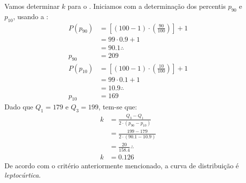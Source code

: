 Vamos determinar $k$ para o . Iniciamos com a
determinação dos percentis $p_{90}$ e $p_{10}$, usando a
:
\begin{align*}
    P(p_{90}) &= \left[(100-1) \cdot \left(\frac{90}{100}\right)\right] + 1 \\
              &= 99 \cdot 0.9 + 1 \\
              &= 90.1 \therefore \\
    p_{90} &= 209
\end{align*}
\begin{align*}
    P(p_{10}) &= \left[(100-1) \cdot \left(\frac{10}{100}\right)\right] + 1 \\
              &= 99 \cdot 0.1 + 1 \\
              &= 10.9 \therefore \\
    p_{10} &= 169
\end{align*}
Dado que $Q_1=179$ e $Q_3=199$, tem-se que:
\begin{align*}
    k &= \frac{Q_3-Q_1}{2 \cdot (p_{90}-p_{10})} \\
      &= \frac{199-179}{2 \cdot (90.1 - 10.9)} \\
      &= \frac{20}{158.4} \therefore \\
    k &= 0.126
\end{align*}
De acordo com o critério anteriormente mencionado, a curva de distribuição é
\emph{leptocúrtica}.

